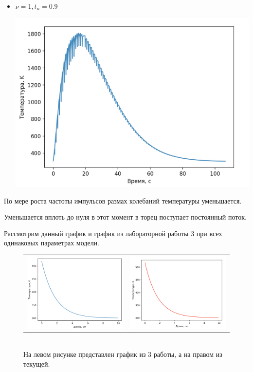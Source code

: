 \documentclass[a4paper,14pt]{extreport} %
\begin{document}
\begin{enumerate}
\begin{itemize}
\item $\nu=1, t_u=0.9$

\includegraphics[scale=0.7]{14}

\end{itemize}

По мере роста частоты импульсов размах колебаний температуры уменьшается. 

Уменьшается вплоть до нуля в этот момент в торец поступает постоянный поток. 

Рассмотрим данный график и график из лабораторной работы 3 при всех одинаковых параметрах модели. 

\begin{figure}[ht]\center
	\begin{tabular}{cc}
		\includegraphics[width=90mm]{11} & \includegraphics[width=90mm]{12}
	\end{tabular}
	\\ На левом рисунке представлен график из 3 работы, а на правом из текущей. 
\end{figure}


\end{enumerate}
\end{document}
